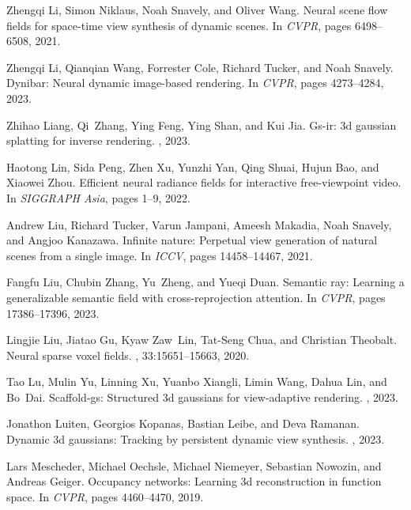 \documentclass{article}
\begin{document}
{\begin{thebibliography}{10}
Zhengqi Li, Simon Niklaus, Noah Snavely, and Oliver Wang.
\newblock Neural scene flow fields for space-time view synthesis of dynamic scenes.
\newblock In {\em CVPR}, pages 6498--6508, 2021.

Zhengqi Li, Qianqian Wang, Forrester Cole, Richard Tucker, and Noah Snavely.
\newblock Dynibar: Neural dynamic image-based rendering.
\newblock In {\em CVPR}, pages 4273--4284, 2023.

Zhihao Liang, Qi~Zhang, Ying Feng, Ying Shan, and Kui Jia.
\newblock Gs-ir: 3d gaussian splatting for inverse rendering.
, 2023.

Haotong Lin, Sida Peng, Zhen Xu, Yunzhi Yan, Qing Shuai, Hujun Bao, and Xiaowei Zhou.
\newblock Efficient neural radiance fields for interactive free-viewpoint video.
\newblock In {\em SIGGRAPH Asia}, pages 1--9, 2022.

Andrew Liu, Richard Tucker, Varun Jampani, Ameesh Makadia, Noah Snavely, and Angjoo Kanazawa.
\newblock Infinite nature: Perpetual view generation of natural scenes from a single image.
\newblock In {\em ICCV}, pages 14458--14467, 2021.

Fangfu Liu, Chubin Zhang, Yu~Zheng, and Yueqi Duan.
\newblock Semantic ray: Learning a generalizable semantic field with cross-reprojection attention.
\newblock In {\em CVPR}, pages 17386--17396, 2023.

Lingjie Liu, Jiatao Gu, Kyaw Zaw~Lin, Tat-Seng Chua, and Christian Theobalt.
\newblock Neural sparse voxel fields.
, 33:15651--15663, 2020.

Tao Lu, Mulin Yu, Linning Xu, Yuanbo Xiangli, Limin Wang, Dahua Lin, and Bo~Dai.
\newblock Scaffold-gs: Structured 3d gaussians for view-adaptive rendering.
, 2023.

Jonathon Luiten, Georgios Kopanas, Bastian Leibe, and Deva Ramanan.
\newblock Dynamic 3d gaussians: Tracking by persistent dynamic view synthesis.
, 2023.

Lars Mescheder, Michael Oechsle, Michael Niemeyer, Sebastian Nowozin, and Andreas Geiger.
\newblock Occupancy networks: Learning 3d reconstruction in function space.
\newblock In {\em CVPR}, pages 4460--4470, 2019.


\end{thebibliography}}
\end{document}
